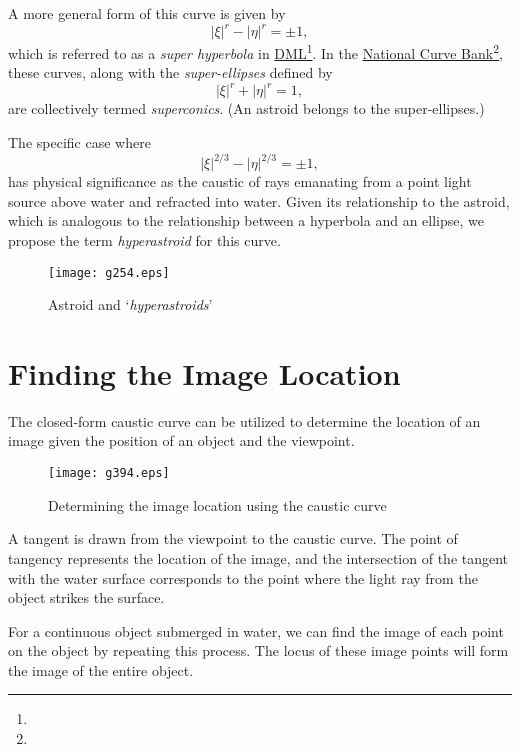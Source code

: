 \documentclass[twocolumn]{article}
\begin{document}
A more general form of this curve is given by 
$$ \left| \xi \right|^{r} - \left| \eta \right|^{r} = \pm1, $$
which is referred to as a \emph{super hyperbola} in \href{http://dynamicmathematicslearning.com/super-ellipse.html}{DML}\footnote{}. In the \href{https://old.nationalcurvebank.org/superconicncb/superconicncb.htm}{National Curve Bank}\footnote{}, these curves, along with the \emph{super-ellipses} defined by
$$ \left| \xi \right|^{r} + \left| \eta \right|^{r} = 1, $$
are collectively termed \emph{superconics}. (An astroid belongs to the super-ellipses.) 

The specific case where 
$$ \left| \xi \right|^{2/3} - \left| \eta \right|^{2/3} = \pm1, $$
has physical significance as the caustic of rays emanating from a point light source above water and refracted into water. Given its relationship to the astroid, which is analogous to the relationship between a hyperbola and an ellipse, we propose the term \emph{hyperastroid} for this curve.

\begin{figure}[h]
	\centering
	\texttt{[image: g254.eps]}
	\caption{Astroid and `\emph{hyperastroids}'}
	\label{fig:hyperastroid}
\end{figure}

\section{Finding the Image Location}

The closed-form caustic curve can be utilized to determine the location of an image given the position of an object and the viewpoint.

\begin{figure}[h]
	\centering
	\texttt{[image: g394.eps]}
	\caption{Determining the image location using the caustic curve}
	\label{fig:image_caustic}
\end{figure}

A tangent is drawn from the viewpoint to the caustic curve. The point of tangency represents the location of the image, and the intersection of the tangent with the water surface corresponds to the point where the light ray from the object strikes the surface.

For a continuous object submerged in water, we can find the image of each point on the object by repeating this process. The locus of these image points will form the image of the entire object.
\end{document}
